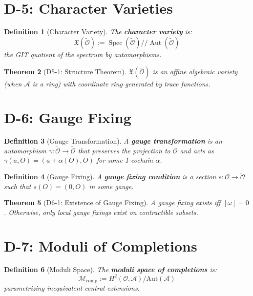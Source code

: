 \documentclass[12pt, oneside]{article}
\newtheorem{theorem}{Theorem}[section]
\newtheorem{definition}[theorem]{Definition}
\DeclareMathOperator{\Spec}{Spec}
\newcommand{\A}{\mathcal{A}}
\newcommand{\Opr}{\mathcal{O}}
\newcommand{\wtilde}{\widetilde}
\begin{document}
\section{D-5: Character Varieties}

\begin{definition}[Character Variety]
The \textbf{character variety} is:
\begin{equation}
\mathfrak{X}(\wtilde{\Opr}) := \Spec(\wtilde{\Opr}) / \!/ \operatorname{Aut}(\wtilde{\Opr})
\end{equation}
the GIT quotient of the spectrum by automorphisms.
\end{definition}

\begin{theorem}[D5-1: Structure Theorem]
$\mathfrak{X}(\wtilde{\Opr})$ is an affine algebraic variety (when $\A$ is a ring) with coordinate ring generated by trace functions.
\end{theorem}

\section{D-6: Gauge Fixing}

\begin{definition}[Gauge Transformation]
A \textbf{gauge transformation} is an automorphism $\gamma: \wtilde{\Opr} \rightarrow \wtilde{\Opr}$ that preserves the projection to $\Opr$ and acts as $\gamma(a, O) = (a + \alpha(O), O)$ for some 1-cochain $\alpha$.
\end{definition}

\begin{definition}[Gauge Fixing]
A \textbf{gauge fixing condition} is a section $s: \Opr \rightarrow \wtilde{\Opr}$ such that $s(O) = (0, O)$ in some gauge.
\end{definition}

\begin{theorem}[D6-1: Existence of Gauge Fixing]
A gauge fixing exists iff $[\omega] = 0$. Otherwise, only local gauge fixings exist on contractible subsets.
\end{theorem}

\section{D-7: Moduli of Completions}

\begin{definition}[Moduli Space]
The \textbf{moduli space of completions} is:
\begin{equation}
\mathcal{M}_{\text{comp}} := H^2(\Opr, \A) / \text{Aut}(\A)
\end{equation}
parametrizing inequivalent central extensions.
\end{definition}
\end{document}
